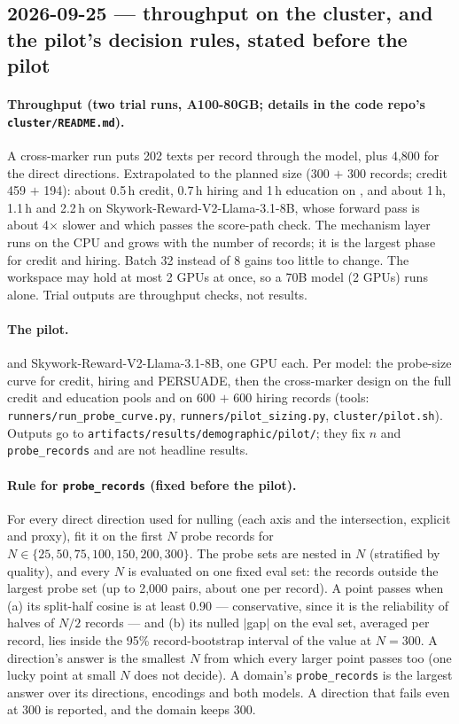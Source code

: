 \documentclass{article}
\begin{document}
\subsection*{2026-09-25 --- throughput on the cluster, and the pilot's decision rules, stated before the pilot}
\paragraph{Throughput (two trial runs, A100-80GB; details in the code repo's \texttt{cluster/README.md}).} A
cross-marker run puts 202 texts per record through the model, plus 4{,}800 for the direct directions. Extrapolated to
the planned size (300 $+$ 300 records; credit 459 $+$ 194): about 0.5\,h credit, 0.7\,h hiring and 1\,h education
on \modelSmall{}, and about 1\,h, 1.1\,h and 2.2\,h on Skywork-Reward-V2-Llama-3.1-8B, whose forward pass is about
4$\times$ slower and which passes the score-path check. The mechanism layer runs on the CPU and grows with the number
of records; it is the largest phase for credit and hiring. Batch 32 instead of 8 gains too little to change. The
workspace may hold at most 2 GPUs at once, so a 70B model (2 GPUs) runs alone. Trial outputs are throughput checks,
not results.

\paragraph{The pilot.} \modelSmall{} and Skywork-Reward-V2-Llama-3.1-8B, one GPU each. Per model: the probe-size
curve for credit, hiring and PERSUADE, then the cross-marker design on the full credit and education pools and on
600 $+$ 600 hiring records (tools: \texttt{runners/run\_probe\_curve.py}, \texttt{runners/pilot\_sizing.py},
\texttt{cluster/pilot.sh}). Outputs go to \texttt{artifacts/results/demographic/pilot/}; they fix $n$ and
\texttt{probe\_records} and are not headline results.

\paragraph{Rule for \texttt{probe\_records} (fixed before the pilot).} For every direct direction used for nulling
(each axis and the intersection, explicit and proxy), fit it on the first $N$ probe records for
$N \in \{25, 50, 75, 100, 150, 200, 300\}$. The probe sets are nested in $N$ (stratified by quality), and every $N$
is evaluated on one fixed eval set: the records outside the largest probe set (up to 2{,}000 pairs, about one per
record). A point passes when (a) its split-half cosine is at least 0.90 --- conservative, since it is the
reliability of halves of $N/2$ records --- and (b) its nulled $|$gap$|$ on the eval set, averaged per record, lies
inside the 95\% record-bootstrap interval of the value at $N=300$. A direction's answer is the smallest $N$ from
which every larger point passes too (one lucky point at small $N$ does not decide). A domain's
\texttt{probe\_records} is the largest answer over its directions, encodings and both models. A direction that
fails even at 300 is reported, and the domain keeps 300.
\end{document}
